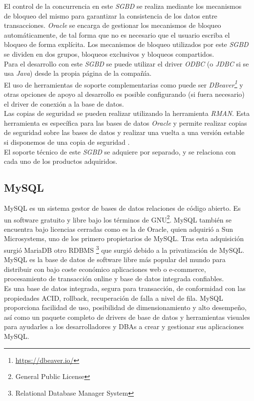 \documentclass[3pt]{article}
\begin{document}
El control de la concurrencia en este \emph{SGBD} se realiza mediante los mecanismos de bloqueo del mismo para garantizar la consistencia de los datos entre transacciones. \emph{Oracle} se encarga de gestionar los mecanismos de bloqueo automáticamente, de tal forma que no es necesario que el usuario escriba el bloqueo de forma explícita.\cite{ORA:6}
Los mecanismos de bloqueo utilizados por este \emph{SGBD} se dividen en dos grupos, bloqueos exclusivos y bloqueos compartidos. \cite{ORA:7} \\

Para el desarrollo con este \emph{SGBD} se puede utilizar el driver \emph{ODBC} (o \emph{JDBC} si se usa \emph{Java}) desde la propia página de la compañía. \\
El uso de herramientas de soporte complementarias como puede ser \emph{DBeaver\footnote{\url{https://dbeaver.io/}}} y otras opciones de apoyo al desarrollo es posible configurando (si fuera necesario) el driver de conexión a la base de datos. \\
Las copias de seguridad se pueden realizar utilizando la herramienta \emph{RMAN}. Esta herramienta es específica para las bases de datos \emph{Oracle} y permite realizar copias de seguridad sobre las bases de datos y realizar una vuelta a una versión estable si disponemos de una copia de seguridad \cite{ORA:8}. \\

El soporte técnico de este \emph{SGBD} se adquiere por separado, y se relaciona con cada uno de los productos adquiridos. \cite{ORA:4} \\

\subsection{MySQL}
MySQL es un sistema gestor de bases de datos relaciones de código abierto. 
Es un software gratuito y libre bajo los términos de GNU\footnote{General Public License}. MySQL también se encuentra bajo licencias cerradas como es la de Oracle, quien adquirió a Sun Microsystems, uno de los primero propietarios de MySQL. Tras esta adquisición surgió MariaDB otro RDBMS \footnote{Relational Database Manager System} que surgió debido a la privatización de MySQL.\\

MySQL es la base de datos de software libre más popular del mundo para distribuir con bajo coste económico aplicaciones web o e-commerce, procesamiento de transacción online y base de datos integrada confiables.  \\
Es una base de datos integrada, segura para transacción, de conformidad con las propiedades ACID, rollback, recuperación de falla a nivel de fila. MySQL proporciona facilidad de uso, posibilidad de dimensionamiento y alto desempeño, así como un paquete completo de drivers de base de datos y herramientas visuales para ayudarles a los desarrolladores y DBAs a crear y gestionar sus aplicaciones MySQL. \\
\end{document}
